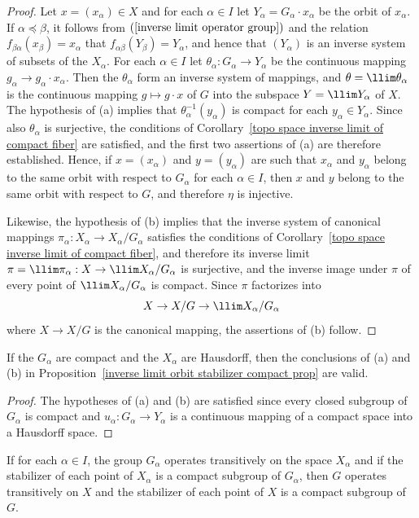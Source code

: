 \begin{proof}
Let $x=(x_\alpha)\in X$ and for each $\alpha\in I$ let $Y_\alpha=G_\alpha\cdot x_\alpha$ be the orbit of $x_\alpha$. If $\alpha\preceq\beta$, it follows from $(\ref{inverse limit operator group})$ and the relation $f_{\beta\alpha}(x_\beta)=x_\alpha$ that $f_{\alpha\beta}(Y_\beta)=Y_\alpha$, and hence that $(Y_\alpha)$ is an inverse system of subsets of the $X_\alpha$. For each $\alpha\in I$ let $\theta_\alpha:G_\alpha\to Y_\alpha$ be the continuous mapping $g_\alpha\to g_\alpha\cdot x_\alpha$. Then the $\theta_\alpha$ form an inverse system of mappings, and $\theta=\llim\theta_\alpha$ is the continuous mapping $g\mapsto g\cdot x$ of $G$ into the subspace $Y=\llim Y_\alpha$ of $X$. The hypothesis of (a) implies that $\theta_\alpha^{-1}(y_\alpha)$ is compact for each $y_\alpha\in Y_\alpha$. Since also $\theta_\alpha$ is surjective, the conditions of Corollary~\ref{topo space inverse limit of compact fiber} are satisfied, and the first two assertions of (a) are therefore established. Hence, if $x=(x_\alpha)$ and $y=(y_\alpha)$ are such that $x_\alpha$ and $y_\alpha$ belong to the same orbit with respect to $G_\alpha$ for each $\alpha\in I$, then $x$ and $y$ belong to the same orbit with respect to $G$, and therefore $\eta$ is injective.\par
Likewise, the hypothesis of (b) implies that the inverse system of canonical mappings $\pi_\alpha:X_\alpha\to X_\alpha/G_\alpha$ satisfies the conditions of Corollary~\ref{topo space inverse limit of compact fiber}, and therefore its inverse limit $\pi=\llim\pi_\alpha:X\to\llim X_\alpha/G_\alpha$ is surjective, and the inverse image under $\pi$ of every point of $\llim X_\alpha/G_\alpha$ is compact. Since $\pi$ factorizes into
\[X\to X/G\to\llim X_\alpha/G_\alpha\]
where $X\to X/G$ is the canonical mapping, the assertions of (b) follow.
\end{proof}
\begin{corollary}\label{inverese limit compact operation groups prop}
If the $G_\alpha$ are compact and the $X_\alpha$ are Hausdorff, then the conclusions of (a) and (b) in Proposition~\ref{inverse limit orbit stabilizer compact prop} are valid.
\end{corollary}
\begin{proof}
The hypotheses of (a) and (b) are satisfied since every closed subgroup of $G_\alpha$ is compact and $u_\alpha:G_\alpha\to Y_\alpha$ is a continuous mapping of a compact space into a Hausdorff space.
\end{proof}
\begin{corollary}
If for each $\alpha\in I$, the group $G_\alpha$ operates transitively on the space $X_\alpha$ and if the stabilizer of each point of $X_\alpha$ is a compact subgroup of $G_\alpha$, then $G$ operates transitively on $X$ and the stabilizer of each point of $X$ is a compact subgroup of $G$.
\end{corollary}
